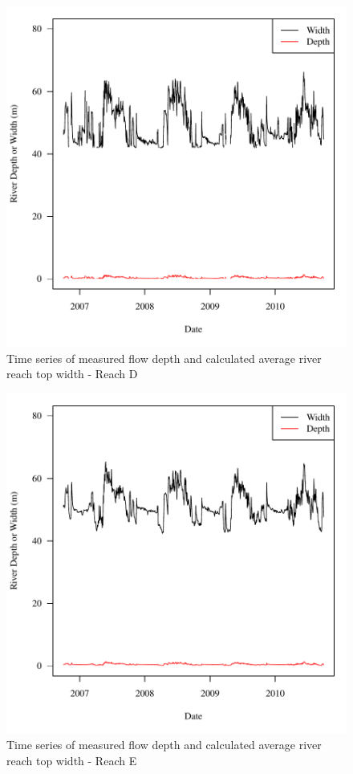 \begin{center}
\begin{figure}[htbp]
	\includegraphics[width=6in]{"Figures/Results_USR/G d&w Today D"}
	\caption{Time series of measured flow depth and calculated average river reach top width - Reach D}
\end{figure}
\end{center}
\newpage

\begin{center}
\begin{figure}[htbp]
	\includegraphics[width=6in]{"Figures/Results_USR/G d&w Today E"}
	\caption{Time series of measured flow depth and calculated average river reach top width - Reach E}
\end{figure}
\end{center}
\newpage

